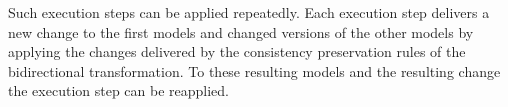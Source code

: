 \begin{definition}
\end{definition}

Such execution steps can be applied repeatedly.
Each execution step delivers a new change to the first models and changed versions of the other models by applying the changes delivered by the consistency preservation rules of the bidirectional transformation.
To these resulting models and the resulting change the execution step can be reapplied.

